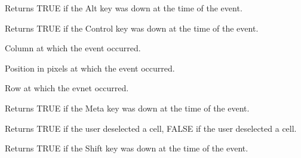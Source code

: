 Returns TRUE if the Alt key was down at the time of the event.

\label{wxgrideventcontroldown}


Returns TRUE if the Control key was down at the time of the event.

\label{wxgrideventgetcol}


Column at which the event occurred.

\label{wxgrideventgetposition}


Position in pixels at which the event occurred.

\label{wxgrideventgetrow}


Row at which the evnet occurred.

\label{wxgrideventmetadown}


Returns TRUE if the Meta key was down at the time of the event.

\label{wxgrideventselecting}


Returns TRUE if the user deselected a cell, FALSE if the user
deselected a cell.

\label{wxgrideventshiftdown}


Returns TRUE if the Shift key was down at the time of the event.

\section{}\label{wxgridrangeselectevent}


\\
\\
\\

